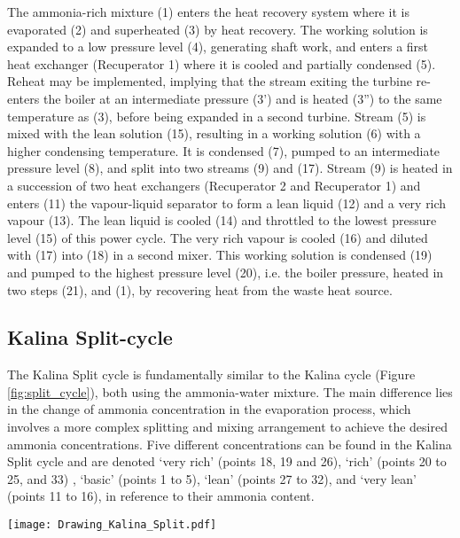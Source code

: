 \documentclass[final,times,3p]{elsarticle}
\begin{document}
The ammonia-rich mixture (1) enters the heat recovery system where it is evaporated (2) and superheated (3) by heat recovery. The working solution is expanded to a low pressure level (4), generating shaft work, and enters a first heat exchanger (Recuperator 1) where it is cooled and partially condensed (5). Reheat may be implemented, implying that the stream exiting the turbine re-enters the boiler at an intermediate pressure (3') and is heated (3'') to the same temperature as (3), before being expanded in a second turbine. Stream (5) is mixed with the lean solution (15), resulting in a working solution (6) with a higher condensing temperature. It is condensed (7), pumped to an intermediate pressure level (8), and split into two streams (9) and (17). Stream (9) is heated in a succession of two heat exchangers (Recuperator 2 and Recuperator 1) and enters (11) the vapour-liquid separator to form a lean liquid (12) and a very rich vapour (13). The lean liquid is cooled (14) and throttled to the lowest pressure level (15) of this power cycle.  The very rich vapour is cooled (16) and diluted with (17) into (18) in a second mixer. This working solution is condensed (19) and pumped to the highest pressure level (20), i.e. the boiler pressure, heated in two steps (21), and (1), by recovering heat from the waste heat source. 

\subsection{Kalina Split-cycle}
\label{sec:split_cycle}

The Kalina Split cycle is fundamentally similar to the Kalina cycle (Figure \ref{fig:split_cycle}), both using the ammonia-water mixture. The main difference lies in the change of ammonia concentration in the evaporation process, which involves a more complex splitting and mixing arrangement to achieve the desired ammonia concentrations. Five different concentrations can be found in the Kalina Split cycle and are denoted `very rich' (points 18, 19 and 26), `rich' (points 20 to 25, and 33) , `basic' (points 1 to 5), `lean' (points 27 to 32), and  `very lean' (points 11 to 16), in reference to their ammonia content. 

\begin{figure*}[htbp]
\centering
\texttt{[image: Drawing\_Kalina\_Split.pdf]}
\caption{Flowchart of the Kalina Split cycle process}
\label{fig:split_cycle}
\end{figure*}
\end{document}
